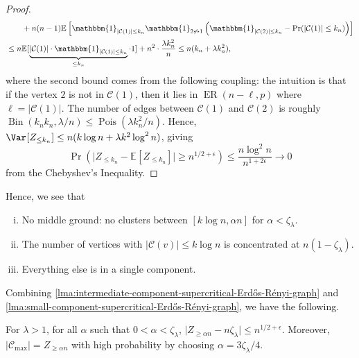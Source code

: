 \begin{proof}
\[\begin{split}
			 & \qquad + n (n-1) \mathbb{E}_{}\left[\mathbbm{1}_{\lvert \mathcal{C} (1) \rvert \leq k_n} \mathbbm{1}_{2 \not\leftrightarrow 1} \left( \mathbbm{1}_{\lvert \mathcal{C} (2) \rvert \leq k_n} - \Pr_{}(\lvert \mathcal{C} (1) \rvert \leq k_n)  \right)  \right] \\
			 & \leq n \mathbb{E}_{}[\underbrace{\lvert \mathcal{C} (1) \rvert \cdot \mathbbm{1}_{\lvert \mathcal{C} (1) \rvert \leq k_n}}_{\leq k_n} \cdot 1 ] + n^2 \cdot \frac{\lambda k_n^2}{n}
			\leq n (k_n + \lambda k_n^2),
		\end{split}
	\]
	where the second bound comes from the following coupling: the intuition is that if the vertex \(2\) is not in \(\mathcal{C} (1)\), then it lies in \(\operatorname{ER}(n - \ell , p) \) where \(\ell = \lvert \mathcal{C} (1) \rvert \). The number of edges between \(\mathcal{C} (1)\) and \(\mathcal{C} (2)\) is roughly \(\operatorname{Bin}(k_n k_n, \lambda / n) \leq \operatorname{Pois}(\lambda k_n^2 / n) \). Hence, \(\Var_{}[Z_{\leq k_n}] \leq n (k \log n + \lambda k^2 \log ^2 n)\), giving
	\[
		\Pr_{}(\lvert Z_{\leq k_n} - \mathbb{E}_{}[Z_{\leq k_n}]  \rvert \geq n^{1 / 2 + \epsilon })
		\leq \frac{n \log ^2 n}{n^{1 + 2 \epsilon }}
		\to 0
	\]
	from the Chebyshev's Inequality.
\end{proof}

Hence, we see that
\begin{enumerate}[(i)]
	\item No middle ground: no clusters between \([k \log n, \alpha n]\) for \(\alpha < \zeta _\lambda \).
	\item The number of vertices with \(\lvert \mathcal{C} (v) \rvert \leq k \log n\) is concentrated at \(n (1 - \zeta _\lambda )\).
	\item Everything else is in a single component.
\end{enumerate}

Combining \autoref{lma:intermediate-component-supercritical-Erdős-Rényi-graph} and \autoref{lma:small-component-supercritical-Erdős-Rényi-graph}, we have the following.

\begin{corollary}
	For \(\lambda > 1\), for all \(\alpha \) such that \(0 < \alpha < \zeta _\lambda \), \(\lvert Z_{\geq \alpha n} - n \zeta _\lambda \rvert \leq n^{1 / 2 + \epsilon }\). Moreover, \(\lvert \mathcal{C} _{\max } \rvert = Z_{\geq \alpha n}\) with high probability by choosing \(\alpha = 3 \zeta _\lambda / 4\).
\end{corollary}

